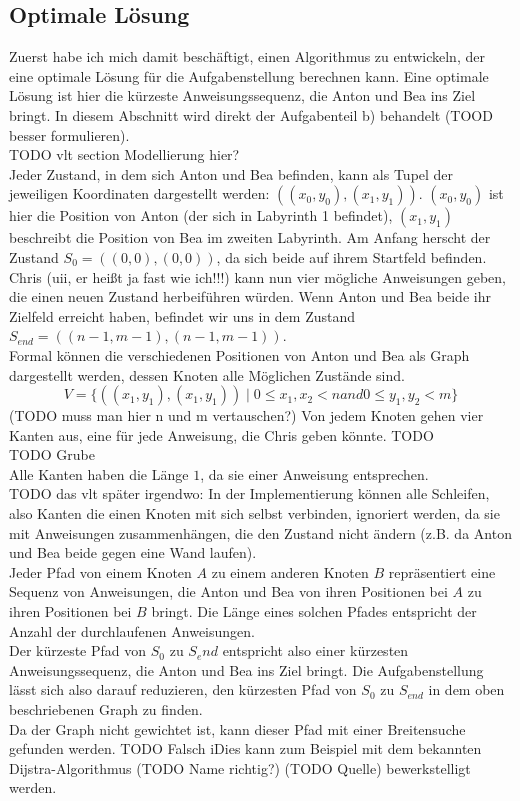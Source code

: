 \documentclass[a4paper,10pt,ngerman]{scrartcl}
\begin{document}
\subsection{Optimale Lösung}
Zuerst habe ich mich damit beschäftigt, einen Algorithmus zu entwickeln, der eine optimale Lösung für die Aufgabenstellung berechnen kann. Eine optimale Lösung ist hier die kürzeste Anweisungssequenz, die Anton und Bea ins Ziel bringt. In diesem Abschnitt wird direkt der Aufgabenteil b) behandelt (TOOD besser formulieren). \\
TODO vlt section Modellierung hier? \\
Jeder Zustand, in dem sich Anton und Bea befinden, kann als Tupel der jeweiligen Koordinaten dargestellt werden: $((x_0,y_0), (x_1, y_1))$.
$(x_0,y_0)$ ist hier die Position von Anton (der sich in Labyrinth 1 befindet), $(x_1, y_1)$ beschreibt die Position von Bea im zweiten Labyrinth. 
Am Anfang herscht der Zustand $S_0 = ((0,0), (0,0))$, da sich beide auf ihrem Startfeld befinden. Chris (uii, er heißt ja fast wie ich!!!) kann nun vier mögliche Anweisungen geben, die einen neuen Zustand herbeiführen würden. Wenn Anton und Bea beide ihr Zielfeld erreicht haben, befindet wir uns in dem Zustand $S_{end} = ((n-1, m-1), (n-1, m-1))$.\\
Formal können die verschiedenen Positionen von Anton und Bea als Graph dargestellt werden, dessen Knoten alle Möglichen Zustände sind. 
\[ V = \{((x_1, y_1), (x_1, y_1)) \mid 0 \le x_1, x_2 < n and 0 \le y_1, y_2 < m\}\] 
(TODO muss man hier n und m vertauschen?)
Von jedem Knoten gehen vier Kanten aus, eine für jede Anweisung, die Chris geben könnte. 
TODO \\
TODO Grube \\
Alle Kanten haben die Länge $1$, da sie einer Anweisung entsprechen. \\
TODO das vlt später irgendwo: In der Implementierung können alle Schleifen, also Kanten die einen Knoten mit sich selbst verbinden, ignoriert werden, da sie mit Anweisungen zusammenhängen, die den Zustand nicht ändern (z.B. da Anton und Bea beide gegen eine Wand laufen). \\

Jeder Pfad von einem Knoten $A$ zu einem anderen Knoten $B$ repräsentiert eine Sequenz von Anweisungen, die Anton und Bea von ihren Positionen bei $A$ zu ihren Positionen bei $B$ bringt.  
Die Länge eines solchen Pfades entspricht der Anzahl der durchlaufenen Anweisungen.\\
Der kürzeste Pfad von $S_0$ zu $S_end$ entspricht also einer kürzesten Anweisungssequenz, die Anton und Bea ins Ziel bringt. Die Aufgabenstellung lässt sich also darauf reduzieren, den kürzesten Pfad von $S_0$ zu $S_{end}$ in dem oben beschriebenen Graph zu finden. \\
Da der Graph nicht gewichtet ist, kann dieser Pfad mit einer Breitensuche gefunden werden.
TODO Falsch iDies kann zum Beispiel mit dem bekannten Dijstra-Algorithmus (TODO Name richtig?) (TODO Quelle) bewerkstelligt werden.
\end{document}
